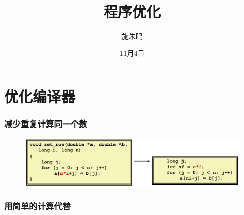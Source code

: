 \documentclass[12pt,AutoFakeBold,aspectratio=43,mathserif]{beamer}
\title{程序优化}
\author{施朱鸣}
\date{11月4日}
\begin{document}
    {
    
    \begin{frame}
    \titlepage
    \end{frame}

    \section{优化编译器}
    \begin{frame}
        \frametitle{减少重复计算同一个数}
    
        \begin{figure}
            \includegraphics[width=\textwidth]{figures/1.png}
        \end{figure}
    
    \end{frame}

    \begin{frame}
        \frametitle{用简单的计算代替}
    

\end{frame}}
\end{document}

